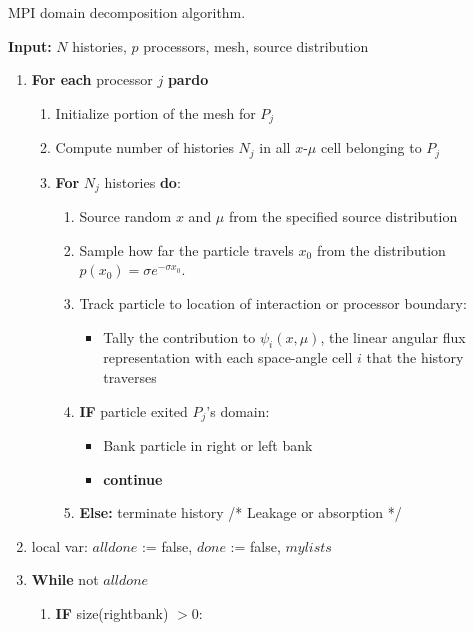 \documentclass[12pt]{article}
\begin{document}
{{\begin{algorithm}
    \caption{MPI domain decomposition algorithm.\label{alg:dec}}
    \vspace{0.06in}
    \textbf{Input:} $N$ histories, $p$ processors, mesh, source distribution
    \vspace{-0.1in}
    \begin{enumerate}
    \item \textbf{For each} processor $j$ \textbf{pardo}
    \begin{enumerate} 
    \item Initialize portion of the mesh for $P_j$
    \item Compute number of histories $N_j$ in all $x$-$\mu$ cell belonging to $P_j$
    \item \textbf{For} {$N_j$ histories} \textbf{do}:
        \begin{enumerate}
       \item Source random $x$ and $\mu$ from the specified source distribution
       \item \label{itm:start} Sample how far the particle travels $x_0$ from the distribution $p(x_0) =
        \sigma e^{-\sigma x_0}$.
    \item Track particle to location of interaction or processor boundary:
        \begin{itemize}
            \item Tally the contribution to $\psi_i(x,\mu)$, the
                linear angular flux representation with each space-angle cell $i$
                that the history traverses
        \end{itemize}
    \item \textbf{IF} particle exited $P_j$'s domain:
        \begin{itemize}
            \item Bank particle in right or left bank
            \item \textbf{continue}
        \end{itemize}
    \item \textbf{Else:} \label{itm:end} terminate history /* Leakage or absorption */
\end{enumerate}
\end{enumerate}
    \item local var: $alldone$ := false, $done$ := false, $mylists$
    \item \textbf{While} not $alldone$
    \begin{enumerate}
       \item \textbf{IF} size(rightbank) $> 0$:

\end{enumerate}
\end{enumerate}
\end{algorithm}}}
\end{document}
